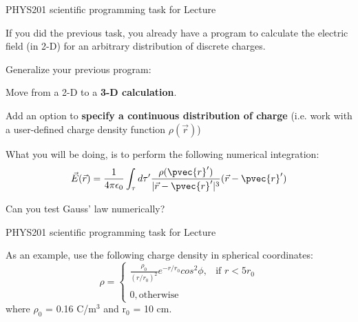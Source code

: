 
{
\programmingslide

%
%
%

\begin{frame}{PHYS201 scientific programming task for Lecture \thislecture}

{\small

If you did the previous task, you already have a program to calculate the
electric field (in 2-D) for an arbitrary distribution of discrete charges.\\
\vspace{0.2cm}

Generalize your previous program:
\begin{itemize}
{
  \item Move from a 2-D to a {\bf 3-D calculation}.
  \item Add an option to {\bf specify a continuous distribution of charge}
        (i.e. work with a user-defined charge density function $\rho(\vec{r})$)
}
\end{itemize}

\vspace{0.2cm}
What you will be doing, is to perform the following numerical integration:
\begin{equation*}
   \vec{E}(\vec{r}) = \frac{1}{4\pi\epsilon_0} \int_{\tau}
      d\tau^{\prime} \frac{\rho({\pvec{r}'})}{|\vec{r}-\pvec{r}'|^{3}} (\vec{r}-\pvec{r}')
\end{equation*}

\vspace{0.3cm}

Can you test Gauss' law numerically?

}
\end{frame}

%
%
%

\begin{frame}{PHYS201 scientific programming task for Lecture \thislecture}

{\small

As an example, use the following charge density in spherical coordinates:
\begin{equation*}
   \rho =
     \begin{cases}
       \frac{\rho_0}{(r/r_0)^2} e^{-r/r_0} cos^2\phi, & \text{if $r < 5 r_0$} \\
       & \\
       0, \text{otherwise}
     \end{cases}
\end{equation*}
where $\rho_0$ = 0.16 C/m$^{3}$ and r$_0$ = 10 cm.\\
%
%

}
\end{frame}}
